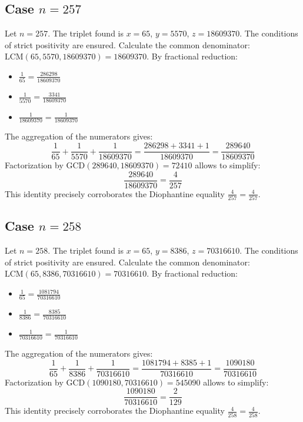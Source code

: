 \documentclass[11pt,a4paper]{article}
\begin{document}
\subsection{Case $n = 257$}
Let $n = 257$. The triplet found is $x = 65$, $y = 5570$, $z = 18609370$.
The conditions of strict positivity are ensured.
Calculate the common denominator: $\text{LCM}(65, 5570, 18609370) = 18609370$.
By fractional reduction:
\begin{itemize}
    \item $\frac{1}{65} = \frac{286298}{18609370}$
    \item $\frac{1}{5570} = \frac{3341}{18609370}$
    \item $\frac{1}{18609370} = \frac{1}{18609370}$
\end{itemize}
The aggregation of the numerators gives:
$$ \frac{1}{65} + \frac{1}{5570} + \frac{1}{18609370} = \frac{286298 + 3341 + 1}{18609370} = \frac{289640}{18609370} $$
Factorization by $\text{GCD}(289640, 18609370) = 72410$ allows to simplify:
$$ \frac{289640}{18609370} = \frac{4}{257} $$
This identity precisely corroborates the Diophantine equality $\frac{4}{257} = \frac{4}{257}$.

\subsection{Case $n = 258$}
Let $n = 258$. The triplet found is $x = 65$, $y = 8386$, $z = 70316610$.
The conditions of strict positivity are ensured.
Calculate the common denominator: $\text{LCM}(65, 8386, 70316610) = 70316610$.
By fractional reduction:
\begin{itemize}
    \item $\frac{1}{65} = \frac{1081794}{70316610}$
    \item $\frac{1}{8386} = \frac{8385}{70316610}$
    \item $\frac{1}{70316610} = \frac{1}{70316610}$
\end{itemize}
The aggregation of the numerators gives:
$$ \frac{1}{65} + \frac{1}{8386} + \frac{1}{70316610} = \frac{1081794 + 8385 + 1}{70316610} = \frac{1090180}{70316610} $$
Factorization by $\text{GCD}(1090180, 70316610) = 545090$ allows to simplify:
$$ \frac{1090180}{70316610} = \frac{2}{129} $$
This identity precisely corroborates the Diophantine equality $\frac{4}{258} = \frac{4}{258}$.
\end{document}
